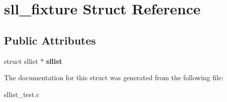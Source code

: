 \hypertarget{structsll__fixture}{\section{sll\-\_\-fixture Struct Reference}
\label{structsll__fixture}
}
\subsection*{Public Attributes}
\begin{DoxyCompactItemize}
\item 
\hypertarget{structsll__fixture_a7077b06a7549929c0cdf57c9e5098306}{struct sllist $\ast$ {\bfseries sllist}}\label{structsll__fixture_a7077b06a7549929c0cdf57c9e5098306}

\end{DoxyCompactItemize}


The documentation for this struct was generated from the following file\-:\begin{DoxyCompactItemize}
\item 
sllist\-\_\-test.\-c\end{DoxyCompactItemize}
